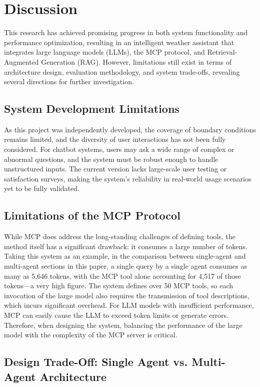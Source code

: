 \documentclass[final-report]{report-template}
\begin{document}
\section{Discussion}


This research has achieved promising progress in both system functionality and performance optimization, resulting in an intelligent weather assistant that integrates large language models (LLMs), the MCP protocol, and Retrieval-Augmented Generation (RAG). However, limitations still exist in terms of architecture design, evaluation methodology, and system trade-offs, revealing several directions for further investigation.

\subsection{System Development Limitations}

As this project was independently developed, the coverage of boundary conditions remains limited, and the diversity of user interactions has not been fully considered. For chatbot systems, users may ask a wide range of complex or abnormal questions, and the system must be robust enough to handle unstructured inputs. The current version lacks large-scale user testing or satisfaction surveys, making the system’s reliability in real-world usage scenarios yet to be fully validated.

\subsection{Limitations of the MCP Protocol}
While MCP does address the long-standing challenges of defining tools, the method itself has a significant drawback: it consumes a large number of tokens. Taking this system as an example, in the comparison between single-agent and multi-agent sections in this paper, a single query by a single agent consumes as many as 5,646 tokens, with the MCP tool alone accounting for 4,517 of those tokens—a very high figure. The system defines over 50 MCP tools, so each invocation of the large model also requires the transmission of tool descriptions, which incurs significant overhead. For LLM models with insufficient performance, MCP can easily cause the LLM to exceed token limits or generate errors. Therefore, when designing the system, balancing the performance of the large model with the complexity of the MCP server is critical.

\subsection{Design Trade-Off: Single Agent vs. Multi-Agent Architecture}
\end{document}
